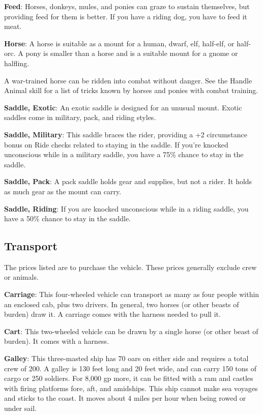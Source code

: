 \textbf{Feed}: Horses, donkeys, mules, and ponies can graze to sustain themselves, but providing feed for them is better. If you have a riding dog, you have to feed it meat.
		
\textbf{Horse}: A horse is suitable as a mount for a human, dwarf, elf, half-elf, or half-orc. A pony is smaller than a horse and is a suitable mount for a gnome or halfling.
		
A war-trained horse can be ridden into combat without danger. See the Handle Animal skill for a list of tricks known by horses and ponies with combat training.
		
\textbf{Saddle, Exotic}: An exotic saddle is designed for an unusual mount. Exotic saddles come in military, pack, and riding styles.
		
\textbf{Saddle, Military}: This saddle braces the rider, providing a +2 circumstance bonus on Ride checks related to staying in the saddle. If you're knocked unconscious while in a military saddle, you have a 75\% chance to stay in the saddle.
		
\textbf{Saddle, Pack}: A pack saddle holds gear and supplies, but not a rider. It holds as much gear as the mount can carry.
		
\textbf{Saddle, Riding}: If you are knocked unconscious while in a riding saddle, you have a 50\% chance to stay in the saddle.
	
\subsection{Transport}

		
The prices listed are to purchase the vehicle. These prices generally exclude crew or animals.
		
\textbf{Carriage}: This four-wheeled vehicle can transport as many as four people within an enclosed cab, plus two drivers. In general, two horses (or other beasts of burden) draw it. A carriage comes with the harness needed to pull it.
		
\textbf{Cart}: This two-wheeled vehicle can be drawn by a single horse (or other beast of burden). It comes with a harness.
		
\textbf{Galley}: This three-masted ship has 70 oars on either side and requires a total crew of 200. A galley is 130 feet long and 20 feet wide, and can carry 150 tons of cargo or 250 soldiers. For 8,000 gp more, it can be fitted with a ram and castles with firing platforms fore, aft, and amidships. This ship cannot make sea voyages and sticks to the coast. It moves about 4 miles per hour when being rowed or under sail.
		
